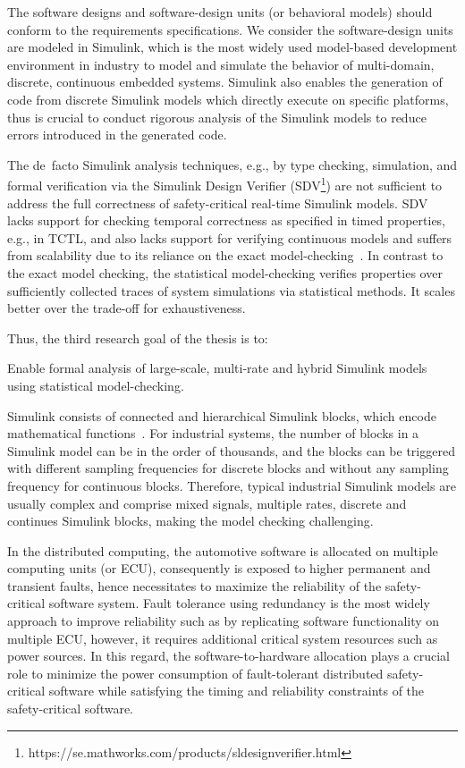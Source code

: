 The software designs and software-design units (or behavioral models) should conform to the requirements specifications. We consider the software-design units are modeled in Simulink, which is the most widely used model-based development environment in industry to model and simulate the behavior of multi-domain, discrete, continuous embedded systems. Simulink also enables the generation of code from discrete Simulink models which directly execute on specific platforms, thus is crucial to conduct rigorous analysis of the Simulink models to reduce errors introduced in the generated code.

The de~facto Simulink analysis techniques, e.g., by type checking, simulation, and formal verification via the Simulink Design Verifier (SDV\footnote{https://se.mathworks.com/products/sldesignverifier.html}) are not sufficient to address the full correctness of safety-critical real-time Simulink models. SDV lacks support for checking temporal correctness as specified in timed properties, e.g., in TCTL, and also lacks support for verifying continuous models and suffers from scalability due to its reliance on the exact model-checking~\cite{Leitner2008SimulinkStudy}. In contrast to the exact model checking, the statistical model-checking verifies properties over sufficiently collected traces of system simulations via statistical methods. It scales better over the trade-off for exhaustiveness. 

Thus, the third research goal of the thesis is to:
\begin{researchgoal}
Enable formal analysis of large-scale, multi-rate and hybrid Simulink models using statistical model-checking.
\end{researchgoal}

Simulink consists of connected and hierarchical Simulink blocks, which encode mathematical functions~\cite{JamesB.Dabney2003MasteringSimulink}. For industrial systems, the number of blocks in a Simulink model can be in the order of thousands, and the blocks can be triggered with different sampling frequencies for discrete blocks and without any sampling frequency 
for continuous blocks. Therefore, typical industrial Simulink models are usually complex and comprise mixed signals, multiple rates, discrete and continues Simulink blocks, making the model checking challenging.

In the distributed computing, the automotive software is allocated on multiple computing units (or ECU), consequently is exposed to higher permanent and transient faults, hence necessitates to maximize the reliability of the safety-critical software system. Fault tolerance using redundancy is the most widely approach to improve reliability such as by replicating software functionality on multiple ECU, however, it requires additional critical system resources such as power sources. In this regard, the software-to-hardware allocation plays a crucial role to minimize the power consumption of fault-tolerant distributed safety-critical software while satisfying the timing and reliability constraints of the safety-critical software.

